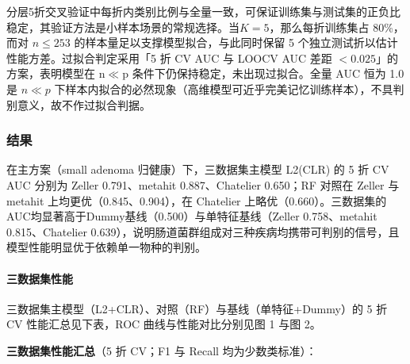\documentclass{../../latex/templates/mcm-paper}
\begin{document}
分层5折交叉验证中每折内类别比例与全量一致，可保证训练集与测试集的正负比稳定，其验证方法是小样本场景的常规选择。当$K=5$，那么每折训练集占 80\%，而对 $n\le253$ 的样本量足以支撑模型拟合，与此同时保留 5 个独立测试折以估计性能方差。过拟合判定采用「5 折 CV AUC 与 LOOCV AUC 差距 $<0.025$」的方案，表明模型在 n$\ll$p 条件下仍保持稳定，未出现过拟合。全量 AUC 恒为 1.0 是 $n\ll p$ 下样本内拟合的必然现象（高维模型可近乎完美记忆训练样本），不具判别意义，故不作过拟合判据。

\subsubsection{结果}
\label{sec:s1-result}

在主方案（small adenoma 归健康）下，三数据集主模型 L2(CLR) 的 5 折 CV AUC 分别为 Zeller 0.791、metahit 0.887、Chatelier 0.650；RF 对照在 Zeller 与 metahit 上均更优（0.845、0.904），在 Chatelier 上略优（0.660）。三数据集的AUC均显著高于Dummy基线（0.500）与单特征基线（Zeller 0.758、metahit 0.815、Chatelier 0.639），说明肠道菌群组成对三种疾病均携带可判别的信号，且模型性能明显优于依赖单一物种的判别。

\paragraph{三数据集性能}

三数据集主模型（L2+CLR）、对照（RF）与基线（单特征+Dummy）的 5 折 CV 性能汇总见下表，ROC 曲线与性能对比分别见图 1 与图 2。

\textbf{三数据集性能汇总}（5 折 CV；F1 与 Recall 均为少数类标准）：
\end{document}
